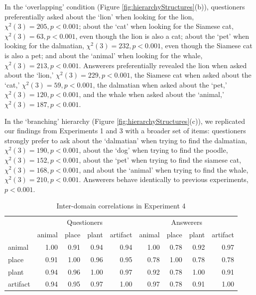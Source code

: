\documentclass[12pt, floatsintext, man]{apa6}
\begin{document}
In the `overlapping' condition (Figure \ref{fig:hierarchyStructures}(b)), questioners preferentially asked about the `lion' when looking for the lion, $\chi^2(3) = 205, p < 0.001$; about the `cat' when looking for the Siamese cat, $\chi^2(3) = 63, p < 0.001$, even though the lion is also a cat; about the `pet' when looking for the dalmatian, $\chi^2(3) = 232, p < 0.001$, even though the Siamese cat is also a pet; and about the `animal' when looking for the whale, $\chi^2(3) = 213, p < 0.001$. Answerers preferentially revealed the lion when asked about the `lion,' $\chi^2(3) = 229, p < 0.001$, the Siamese cat when asked about the `cat,' $\chi^2(3) = 59, p < 0.001$, the dalmatian when asked about the `pet,' $\chi^2(3) = 120, p < 0.001$, and the whale when asked about the `animal,' $\chi^2(3) = 187, p < 0.001$. 

In the `branching' hierarchy (Figure \ref{fig:hierarchyStructures}(c)), we replicated our findings from Experiments 1 and 3 with a broader set of items: questioners strongly prefer to ask about the `dalmatian' when trying to find the dalmatian, $\chi^2(3) = 190, p < 0.001$, about the `dog' when trying to find the poodle, $\chi^2(3) = 152, p < 0.001$, about the `pet' when trying to find the siamese cat, $\chi^2(3) = 168, p < 0.001$, and about the `animal' when trying to find the whale, $\chi^2(3) = 210, p < 0.001$. Answerers behave identically to previous experiments, $p < 0.001$.

\begin{table}[b]
\centering
\begin{tabular}{ p{1.5cm} | r | r | r | r |||||| r | r | r | r |}
& \multicolumn{4}{c||||||}{Questioners} & \multicolumn{4}{c}{Answerers} \\
&             animal &     place &     plant &  artifact &            animal &     place &     plant &  artifact \\
\hline
animal &   1.00 &  0.91 & 0.94 & 0.94 & 1.00 & 0.78 & 0.92 &  0.97 \\
\hline
place &    0.91 &  1.00 & 0.96 & 0.95 & 0.78 & 1.00 &  0.78 & 0.78 \\
\hline
plant &    0.94 & 0.96 & 1.00 & 0.97 & 0.92  & 0.78 &  1.00 & 0.91\\
\hline
artifact & 0.94 & 0.95 & 0.97 & 1.00 & 0.97 & 0.78 &  0.91 & 1.00\\
\end{tabular}
\\[1.5pt]
\caption{Inter-domain correlations in Experiment 4} 
\label{table:experiment4correlations}
\end{table}
\end{document}
